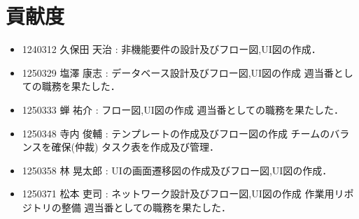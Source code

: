 \documentclass[a4paper, titlepage]{jsarticle}
\begin{document}
\section{貢献度}
\begin{itemize}
  \item 1240312 久保田 天治 : 非機能要件の設計及びフロー図,UI図の作成．
  \item 1250329 塩澤 康志 : データベース設計及びフロー図,UI図の作成 週当番としての職務を果たした．
  \item 1250333 蝉 祐介 : フロー図,UI図の作成 週当番としての職務を果たした．
  \item 1250348 寺内 俊輔 : テンプレートの作成及びフロー図の作成 チームのバランスを確保(仲裁) タスク表を作成及び管理．
  \item 1250358 林 晃太郎 : UIの画面遷移図の作成及びフロー図,UI図の作成．
  \item 1250371 松本 吏司 : ネットワーク設計及びフロー図,UI図の作成 作業用リポジトリの整備 週当番としての職務を果たした．
\end{itemize}


\end{document}
